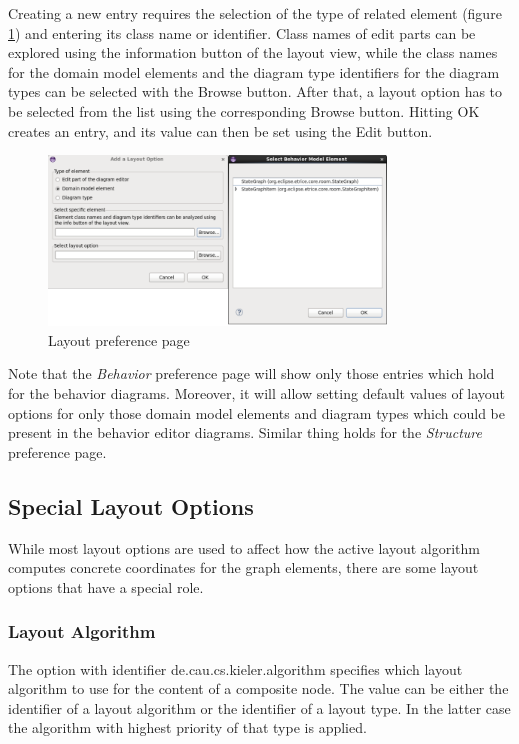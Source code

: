 Creating a new entry requires the selection of the type of related element (figure \ref{fig_layout_preference_page})
and entering its class name or 
identifier. Class names of edit parts can be explored using the information button of the layout view, 
while the class names for the domain model elements and the diagram type identifiers for the diagram types 
can be selected with the Browse button. After that, a layout option has to be selected from the list using 
the corresponding Browse button. Hitting OK creates an entry, and its value can then be set using the Edit 
button.

\begin{figure}
\includegraphics[width=0.8\textwidth]{images/043-PreferencePage.png}
\caption{Layout preference page}
\label{fig_layout_preference_page}
\end{figure}

Note that the \textit{Behavior} preference page will show only those entries which hold for the behavior 
diagrams. Moreover, it will allow setting default values of layout options for only those domain model 
elements and diagram types which could be present in the behavior editor diagrams. Similar thing holds for 
the \textit{Structure} preference page.

\subsection{Special Layout Options}
\label{specialOptions}

While most layout options are used to affect how the active layout algorithm computes concrete coordinates 
for the graph elements, there are some layout options that have a special role.

\subsubsection{Layout Algorithm}

The option with identifier de.cau.cs.kieler.algorithm specifies which layout algorithm to use for the 
content of a composite node. The value can be either the identifier of a layout algorithm or the 
identifier of a layout type. In the latter case the algorithm with highest priority of that type is applied.

